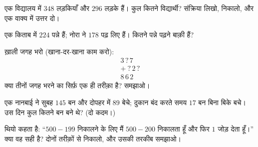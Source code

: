 \begin{exercise}[$\star$]\label{exo:g3:addsub:7}
एक विद्यालय में $348$ लड़कियाँ और $296$ लड़के हैं। कुल कितने
विद्यार्थी? संक्रिया लिखो, निकालो, और एक वाक्य में उत्तर दो।
\end{exercise}

\begin{exercise}[$\star$]\label{exo:g3:addsub:8}
एक किताब में $224$ पन्ने हैं; नोरा ने $178$ पढ़ लिए हैं। कितने
पन्ने पढ़ने बाक़ी हैं?
\end{exercise}

\begin{exercise}[$\star$]\label{exo:g3:addsub:9}
ख़ाली जगह भरो (खाना-दर-खाना काम करो):
\[
\begin{array}{r}
3\,?\,7 \\
+\ ?\,2\,? \\
\hline
8\,6\,2
\end{array}
\]
क्या तीनों जगह भरने का सिर्फ़ एक ही तरीक़ा है? समझाओ।
\end{exercise}

\begin{exercise}[$\star\star$]\label{exo:g3:addsub:10}
एक नानबाई ने सुबह $145$ बन और दोपहर में $89$ बेचे; दुकान बंद
करते समय $17$ बन बिना बिके बचे। उस दिन कुल कितने बन बने थे?
(दो कदम।)
\end{exercise}

\begin{exercise}[$\star\star$]\label{exo:g3:addsub:11}
थियो कहता है: ``$500 - 199$ निकालने के लिए मैं $500 - 200$
निकालता हूँ और फिर $1$ जोड़ देता हूँ।'' क्या वह सही है? दोनों तरीक़ों से निकालो, और उसकी तरकीब समझाओ।
\end{exercise}

